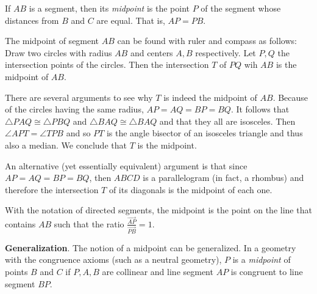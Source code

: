 \documentclass[12pt]{article}
\begin{document}
If $AB$ is a segment, then its \emph{midpoint} is the point $P$ of the segment whose distances from $B$ and $C$ are equal. That is, $AP = PB$.

The midpoint of segment $AB$ can be found with ruler and compass as follows: Draw two circles with radius $AB$ and centers $A,B$ respectively. Let $P,Q$ the intersection points of the circles. Then the intersection $T$ of $PQ$ wih $AB$ is the midpoint of $AB$.

\begin{center}
\end{center}

There are several arguments to see why $T$ is indeed the midpoint of $AB$. Because of the circles having the same radius, $AP=AQ=BP=BQ$. It follows that $\triangle PAQ\cong\triangle PBQ$ and $\triangle  BAQ\cong \triangle BAQ$ and that they all are isosceles. Then $\angle APT =\angle TPB$ and so $PT$ is the angle bisector of an isosceles triangle and thus also a median. We conclude that $T$ is the midpoint. 

An alternative (yet essentially equivalent) argument is  that since $AP=AQ=BP=BQ$, then $ABCD$ is a parallelogram (in fact, a rhombus) and therefore
the intersection $T$ of its diagonals is the midpoint of each one.

With the notation of directed segments, the midpoint is the point on the line that contains $AB$ such that the ratio $\frac{\overrightarrow{AP}}{\overrightarrow{PB}}=1$.

\textbf{Generalization}.  The notion of a midpoint can be generalized.  In a geometry with the congruence axioms (such as a neutral geometry), $P$ is a \emph{midpoint} of points $B$ and $C$ if $P,A,B$ are collinear and line segment $AP$ is congruent to line segment $BP$. 
\end{document}
